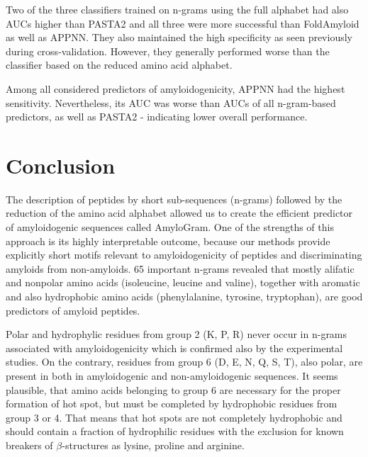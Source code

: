 \documentclass[fleqn,10pt,twoside]{gcb15submission}
\begin{document}
  Two of  the three classifiers trained on  n-grams using  the full alphabet 
%
%
%
%
%
had also AUCs higher than PASTA2 and all three were more successful than 
FoldAmyloid as well as APPNN. They also maintained the high specificity as seen 
previously during cross-validation. However, they generally performed worse than 
the classifier based on the reduced amino acid alphabet.
  
  Among all considered predictors of amyloidogenicity, APPNN had the highest 
sensitivity. Nevertheless, its AUC was worse than AUCs of all n-gram-based 
predictors, as well as PASTA2  - indicating lower overall performance.


\section{Conclusion}

The description of peptides by short sub-sequences (n-grams) followed by the 
reduction of the amino acid alphabet allowed us to create the efficient 
predictor of amyloidogenic sequences called AmyloGram. One of the strengths of 
this approach is its highly interpretable outcome, because our methods provide 
explicitly short motifs relevant to amyloidogenicity of peptides and 
discriminating amyloids from  non-amyloids. 65 important n-grams revealed that 
mostly alifatic and nonpolar amino acids (isoleucine, leucine and valine), 
together with aromatic and also hydrophobic amino acids (phenylalanine, 
tyrosine, tryptophan), are good predictors of amyloid peptides.

Polar and hydrophylic residues from group 2 (K, P, R) never occur in n-grams 
associated with amyloidogenicity which is confirmed also by the experimental 
studies. On the contrary, residues from group 6 (D, E, N, Q, S, T), also polar, 
are present in both in amyloidogenic and non-amyloidogenic sequences. It seems 
plausible, that amino acids belonging to group 6 are necessary for the proper 
formation of hot spot, but must be completed by hydrophobic residues from group 
3 or 4. That means that hot spots are not completely hydrophobic and should 
contain a fraction of hydrophilic residues with the exclusion for known 
breakers of $\beta$-structures as lysine, proline and arginine.
\end{document}

